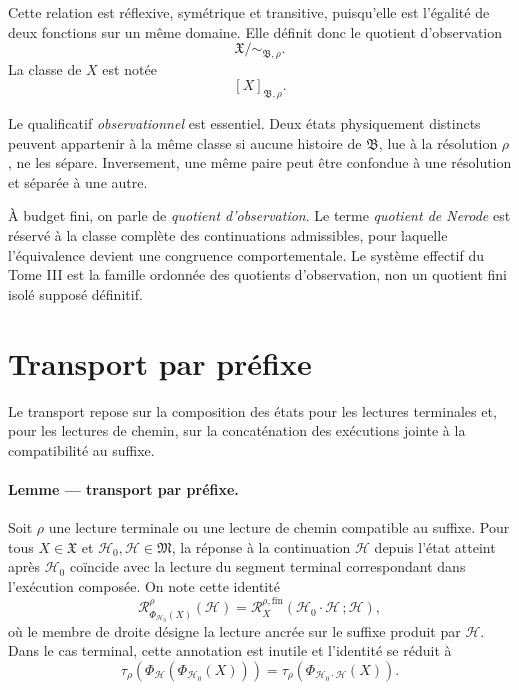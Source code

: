Cette relation est réflexive, symétrique et transitive, puisqu'elle est
l'égalité de deux fonctions sur un même domaine. Elle définit donc le
quotient d'observation
\[
\mathfrak X/{\sim_{\mathfrak B,\rho}}.
\]
La classe de \(X\) est notée
\[
[X]_{\mathfrak B,\rho}.
\]

Le qualificatif \emph{observationnel} est essentiel. Deux états
physiquement distincts peuvent appartenir à la même classe si aucune
histoire de \(\mathfrak B\), lue à la résolution \(\rho\), ne les
sépare. Inversement, une même paire peut être confondue à une
résolution et séparée à une autre.

\begin{encadre}[title={Vocabulaire}]
À budget fini, on parle de \emph{quotient d'observation}. Le terme
\emph{quotient de Nerode} est réservé à la classe complète des
continuations admissibles, pour laquelle l'équivalence devient une
congruence comportementale. Le système effectif du Tome III est la
famille ordonnée des quotients d'observation, non un quotient fini
isolé supposé définitif.
\end{encadre}

\section{Transport par préfixe}
\label{annexe-histoires-transport}

Le transport repose sur la composition des états pour les lectures
terminales et, pour les lectures de chemin, sur la concaténation des
exécutions jointe à la compatibilité au suffixe.

\paragraph{Lemme \theproposition{} --- transport par préfixe.}
Soit \(\rho\) une lecture terminale ou une lecture de chemin compatible
au suffixe. Pour tous \(X\in\mathfrak X\) et
\(\mathcal H_0,\mathcal H\in\mathfrak M\), la réponse à la
continuation \(\mathcal H\) depuis l'état atteint après
\(\mathcal H_0\) coïncide avec la lecture du segment terminal
correspondant dans l'exécution composée. On note cette identité
\begin{equation}
\label{eq:annexe-G-identite-transport}
\mathcal R_{\Phi_{\mathcal H_0}(X)}^\rho(\mathcal H)
=
\mathcal R_X^{\rho,\mathrm{fin}}
  (\mathcal H_0\cdot\mathcal H\,;\mathcal H),
\end{equation}
où le membre de droite désigne la lecture ancrée sur le suffixe produit
par \(\mathcal H\). Dans le cas terminal, cette annotation est inutile
et l'identité se réduit à
\[
\tau_\rho\!\left(
\Phi_{\mathcal H}(\Phi_{\mathcal H_0}(X))
\right)
=
\tau_\rho\!\left(
\Phi_{\mathcal H_0\cdot\mathcal H}(X)
\right).
\]

